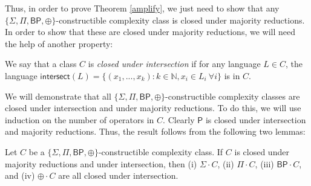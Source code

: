 \documentclass[11pt]{article}
\newcommand{\bp}{\textsf{BP}}
\newcommand{\parity}{\oplus}
\newcommand{\p}{\textsf{P}}
\newcommand{\intersection}{\textsf{intersect}}
\begin{document}
Thus, in order to prove Theorem \ref{amplify}, we just need to show that any \emph{$\{\Sigma,\Pi,\bp,\parity\}$}-constructible complexity class is closed under majority reductions. In order to show that these are closed under majority reductions, we will need the help of another property:
\begin{definition}\label{defintersection}
We say that a class $C$ is \emph{closed under intersection} if for any language $L \in C$, the language $\intersection(L) = \{(x_1,...,x_k) : k\in\mathbb{N}, x_i \in L_i ~ \forall i\}$ is in $C$.
\end{definition}
We will demonstrate that all $\{\Sigma, \Pi, \bp, \parity\}$-constructible complexity classes are closed under intersection and under majority reductions. To do this, we will use induction on the number of operators in $C$. Clearly $\p$ is closed under intersection and majority reductions. Thus, the result follows from the following two lemmas:

\begin{lemma}\label{intersectionlemma}
Let $C$ be a \emph{$\{\Sigma,\Pi,\bp,\parity\}$}-constructible complexity class. If $C$ is closed under majority reductions and under intersection, then (i) \emph{$\Sigma \cdot C$}, (ii) \emph{$\Pi \cdot C$}, (iii) \emph{$\bp \cdot C$}, and (iv) \emph{$\parity \cdot C$} are all closed under intersection.
\end{lemma}
\end{document}

